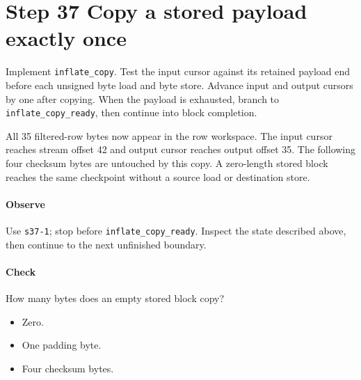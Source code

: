 \section{Step 37 Copy a stored payload exactly once}\label{png-inflate-s37}
Implement \texttt{inflate\_copy}. Test the input cursor against its retained payload end before each unsigned byte load and byte store. Advance input and output cursors by one after copying. When the payload is exhausted, branch to \texttt{inflate\_copy\_ready}, then continue into block completion.

All 35 filtered-row bytes now appear in the row workspace. The input cursor reaches stream offset 42 and output cursor reaches output offset 35. The following four checksum bytes are untouched by this copy. A zero-length stored block reaches the same checkpoint without a source load or destination store.

\paragraph{Observe} Use \texttt{s37-1}; stop before \texttt{inflate\_copy\_ready}. Inspect the state described above, then continue to the next unfinished boundary.

\paragraph{Check} How many bytes does an empty stored block copy?
\begin{itemize}
  \item[A.] Zero.
  \item[B.] One padding byte.
  \item[C.] Four checksum bytes.
\end{itemize}
